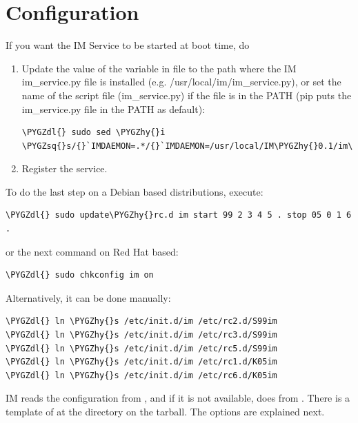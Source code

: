 \documentclass[letterpaper,10pt,english]{sphinxmanual}
\def\PYGZus{\char`\_}
\def\PYGZdl{\char`\$}
\def\PYGZhy{\char`\-}
\def\PYGZsq{\char`\'}
\begin{document}
\section{Configuration}
\label{manual:configuration}
If you want the IM Service to be started at boot time, do
\begin{enumerate}
\item {} 
Update the value of the variable  in  file
to the path where the IM im\_service.py file is installed (e.g. /usr/local/im/im\_service.py),
or set the name of the script file (im\_service.py) if the file is in the PATH
(pip puts the im\_service.py file in the PATH as default):

\begin{Verbatim}[commandchars=\\\{\}]
\PYGZdl{} sudo sed \PYGZhy{}i \PYGZsq{}s/{}`IMDAEMON=.*/{}`IMDAEMON=/usr/local/IM\PYGZhy{}0.1/im\PYGZus{}service.py\PYGZsq{}/etc/init.d/im
\end{Verbatim}

\item {} 
Register the service.

\end{enumerate}

To do the last step on a Debian based distributions, execute:

\begin{Verbatim}[commandchars=\\\{\}]
\PYGZdl{} sudo update\PYGZhy{}rc.d im start 99 2 3 4 5 . stop 05 0 1 6 .
\end{Verbatim}

or the next command on Red Hat based:

\begin{Verbatim}[commandchars=\\\{\}]
\PYGZdl{} sudo chkconfig im on
\end{Verbatim}

Alternatively, it can be done manually:

\begin{Verbatim}[commandchars=\\\{\}]
\PYGZdl{} ln \PYGZhy{}s /etc/init.d/im /etc/rc2.d/S99im
\PYGZdl{} ln \PYGZhy{}s /etc/init.d/im /etc/rc3.d/S99im
\PYGZdl{} ln \PYGZhy{}s /etc/init.d/im /etc/rc5.d/S99im
\PYGZdl{} ln \PYGZhy{}s /etc/init.d/im /etc/rc1.d/K05im
\PYGZdl{} ln \PYGZhy{}s /etc/init.d/im /etc/rc6.d/K05im
\end{Verbatim}

IM reads the configuration from , and if it is not
available, does from . There is a template of 
at the directory  on the tarball. The options are explained next.
\end{document}
